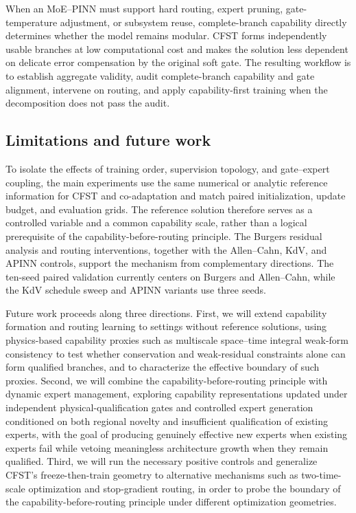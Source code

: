 \documentclass[preprint,12pt]{elsarticle}
\theoremstyle{remark}
\begin{document}
\FloatBarrier
When an MoE--PINN must support hard routing, expert pruning, gate-temperature adjustment, or subsystem reuse, complete-branch capability directly determines whether the model remains modular. CFST forms independently usable branches at low computational cost and makes the solution less dependent on delicate error compensation by the original soft gate. The resulting workflow is to establish aggregate validity, audit complete-branch capability and gate alignment, intervene on routing, and apply capability-first training when the decomposition does not pass the audit.

\subsection{Limitations and future work}
To isolate the effects of training order, supervision topology, and gate--expert coupling, the main experiments use the same numerical or analytic reference information for CFST and co-adaptation and match paired initialization, update budget, and evaluation grids. The reference solution therefore serves as a controlled variable and a common capability scale, rather than a logical prerequisite of the capability-before-routing principle. The Burgers residual analysis and routing interventions, together with the Allen--Cahn, KdV, and APINN controls, support the mechanism from complementary directions. The ten-seed paired validation currently centers on Burgers and Allen--Cahn, while the KdV schedule sweep and APINN variants use three seeds.

Future work proceeds along three directions. First, we will extend capability formation and routing learning to settings without reference solutions, using physics-based capability proxies such as multiscale space--time integral weak-form consistency to test whether conservation and weak-residual constraints alone can form qualified branches, and to characterize the effective boundary of such proxies. Second, we will combine the capability-before-routing principle with dynamic expert management, exploring capability representations updated under independent physical-qualification gates and controlled expert generation conditioned on both regional novelty and insufficient qualification of existing experts, with the goal of producing genuinely effective new experts when existing experts fail while vetoing meaningless architecture growth when they remain qualified. Third, we will run the necessary positive controls and generalize CFST's freeze-then-train geometry to alternative mechanisms such as two-time-scale optimization and stop-gradient routing, in order to probe the boundary of the capability-before-routing principle under different optimization geometries.
\end{document}
